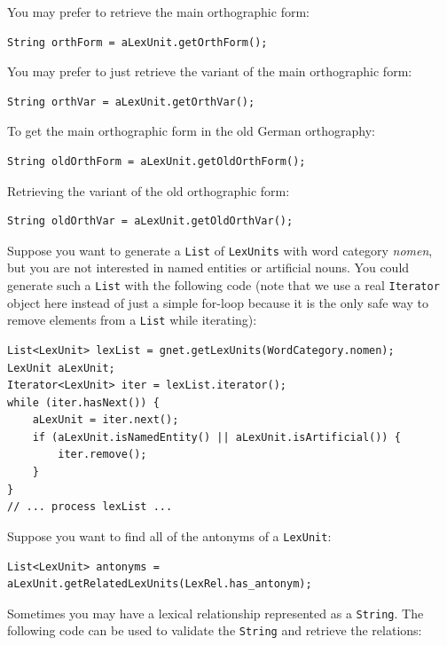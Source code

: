 \documentclass[12pt,a4paper,english,utf8]{report}
\begin{document}
You may prefer to retrieve the main orthographic form:

\begin{lstlisting}
String orthForm = aLexUnit.getOrthForm();
\end{lstlisting}

You may prefer to just retrieve the variant of the main orthographic form:

\begin{lstlisting}
String orthVar = aLexUnit.getOrthVar();
\end{lstlisting}

To get the main orthographic form in the old German orthography:

\begin{lstlisting}
String oldOrthForm = aLexUnit.getOldOrthForm();
\end{lstlisting}

Retrieving the variant of the old orthographic form:

\begin{lstlisting}
String oldOrthVar = aLexUnit.getOldOrthVar();
\end{lstlisting}

Suppose you want to generate a \texttt{List} of \texttt{LexUnits} with word category \emph{nomen}, but you are not interested in named entities or artificial nouns. You could generate such a \texttt{List} with the following code (note that we use a real \texttt{Iterator} object here instead of just a simple for-loop because it is the only safe way to remove elements from a \texttt{List} while iterating):

\begin{lstlisting}
List<LexUnit> lexList = gnet.getLexUnits(WordCategory.nomen);
LexUnit aLexUnit;
Iterator<LexUnit> iter = lexList.iterator();
while (iter.hasNext()) {
    aLexUnit = iter.next();
    if (aLexUnit.isNamedEntity() || aLexUnit.isArtificial()) {
        iter.remove();
    }
}
// ... process lexList ...
\end{lstlisting}

Suppose you want to find all of the antonyms of a \texttt{LexUnit}:

\begin{lstlisting}
List<LexUnit> antonyms = aLexUnit.getRelatedLexUnits(LexRel.has_antonym);
\end{lstlisting}

Sometimes you may have a lexical relationship represented as a \texttt{String}. The following code can be used to validate the \texttt{String} and retrieve the relations:
\end{document}
